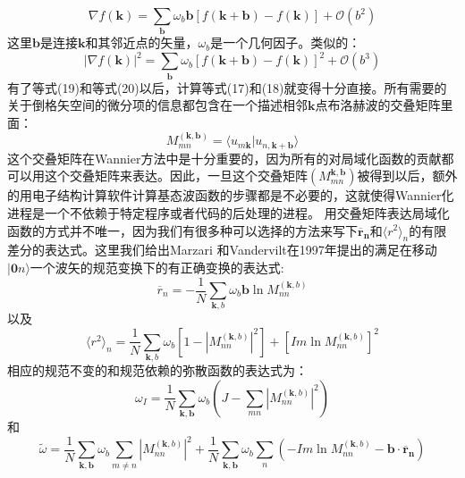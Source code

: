 \begin{equation}
\nabla f(\bm{k})=\sum_{\bm{b}}\omega_b\bm{b}[f(\bm{k}+\bm{b})-f(\bm{k})]+\mathcal{O}(b^2)
\end{equation}
这里$\bm{b}$是连接$\bm{k}$和其邻近点的矢量，$\omega_b$是一个几何因子。类似的：
\begin{equation}
|\nabla f(\bm{k})|^2=\sum_{\bm{b}}\omega_b[f(\bm{k}+\bm{b})-f(\bm{k})]^2+\mathcal{O}(b^3)
\end{equation}
有了等式(19)和等式(20)以后，计算等式(17)和(18)就变得十分直接。所有需要的关于倒格矢空间的微分项的信息都包含在一个描述相邻$\bm{k}$点布洛赫波的交叠矩阵里面：
\begin{equation}
M^{(\bm{k},\bm{b})}_{mn}=\langle u_{m \bm{k}}|u_{n,\bm{k}+\bm{b}} \rangle
\end{equation}
这个交叠矩阵在Wannier方法中是十分重要的，因为所有的对局域化函数的贡献都可以用这个交叠矩阵来表达。因此，一旦这个交叠矩阵$(M^{\bm{k},\bm{b}}_{mn})$被得到以后，额外的用电子结构计算软件计算基态波函数的步骤都是不必要的，这就使得Wannier化进程是一个不依赖于特定程序或者代码的后处理的进程。
用交叠矩阵表达局域化函数的方式并不唯一，因为我们有很多种可以选择的方法来写下$\bm{\overline r_n}$和$\langle r^2\rangle_n$的有限差分的表达式。这里我们给出Marzari 和Vandervilt在1997年提出的满足在移动$|\bm{0}n \rangle$一个波矢的规范变换下的有正确变换的表达式:
\begin{equation}
\overline r_{n}=-\frac{1}{N}\sum_{\bm{k},b}\omega_b\bm{b}\ln M^{(\bm{k},b)}_{nn}
\end{equation}
以及
\begin{equation}
\langle r^2\rangle_{n}=\frac{1}{N}\sum_{\bm{k},b}\omega_b{[1-|M^{(\bm{k},b)}_{nn}|^2]+[Im \ln M^{(\bm{k},b)}_{nn} ]^2}
\end{equation}
相应的规范不变的和规范依赖的弥散函数的表达式为：
\begin{equation}
\omega_I=\frac{1}{N}\sum_{\bm{k},\bm{b}}\omega_b(J-\sum_{mn}|M^{(\bm{k},b)}_{nn}|^2)
\end{equation}
和
\begin{equation}
\widetilde \omega=\frac{1}{N}\sum_{\bm{k},\bm{b}}\omega_b\sum_{m \neq n}|M^{(\bm{k},b)}_{nn}|^2+\frac{1}{N}\sum_{\bm{k},\bm{b}}\omega_b\sum_{n}(-Im \ln M^{(\bm{k},b)}_{nn}-\bm{b} \cdot \bm{\overline r_n})
\end{equation}

